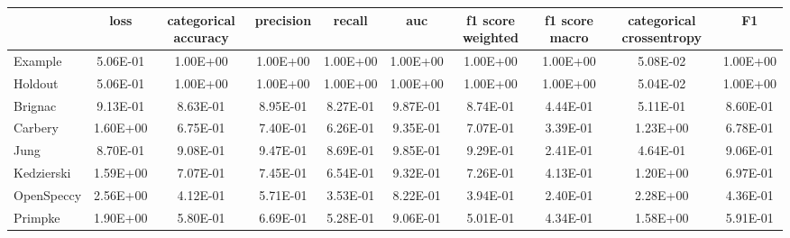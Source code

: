 \begin{tabular}{lccccccccc}
\toprule
 & loss & categorical accuracy & precision & recall & auc & f1 score weighted & f1 score macro & categorical crossentropy & F1 \\
\midrule
Example & 5.06E-01 & 1.00E+00 & 1.00E+00 & 1.00E+00 & 1.00E+00 & 1.00E+00 & 1.00E+00 & 5.08E-02 & 1.00E+00 \\
Holdout & 5.06E-01 & 1.00E+00 & 1.00E+00 & 1.00E+00 & 1.00E+00 & 1.00E+00 & 1.00E+00 & 5.04E-02 & 1.00E+00 \\
Brignac & 9.13E-01 & 8.63E-01 & 8.95E-01 & 8.27E-01 & 9.87E-01 & 8.74E-01 & 4.44E-01 & 5.11E-01 & 8.60E-01 \\
Carbery & 1.60E+00 & 6.75E-01 & 7.40E-01 & 6.26E-01 & 9.35E-01 & 7.07E-01 & 3.39E-01 & 1.23E+00 & 6.78E-01 \\
Jung & 8.70E-01 & 9.08E-01 & 9.47E-01 & 8.69E-01 & 9.85E-01 & 9.29E-01 & 2.41E-01 & 4.64E-01 & 9.06E-01 \\
Kedzierski & 1.59E+00 & 7.07E-01 & 7.45E-01 & 6.54E-01 & 9.32E-01 & 7.26E-01 & 4.13E-01 & 1.20E+00 & 6.97E-01 \\
OpenSpeccy & 2.56E+00 & 4.12E-01 & 5.71E-01 & 3.53E-01 & 8.22E-01 & 3.94E-01 & 2.40E-01 & 2.28E+00 & 4.36E-01 \\
Primpke & 1.90E+00 & 5.80E-01 & 6.69E-01 & 5.28E-01 & 9.06E-01 & 5.01E-01 & 4.34E-01 & 1.58E+00 & 5.91E-01 \\
\bottomrule
\end{tabular}

